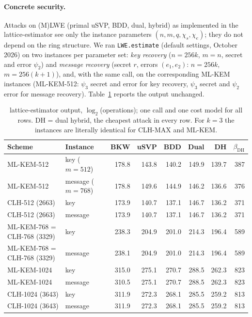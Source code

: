 \documentclass[11pt]{article}
\theoremstyle{remark}
\begin{document}
\paragraph{Concrete security.} Attacks on (M)LWE (primal uSVP, BDD, dual, hybrid) as implemented in the lattice-estimator \cite{APS15} see only the instance parameters $(n,m,q,\chi_s,\chi_e)$; they do not depend on the ring structure. We ran \texttt{LWE.estimate} (default settings, October 2026) on two instances per parameter set: \emph{key recovery} ($n=256k$, $m=n$, secret and error $\psi_2$) and \emph{message recovery} (secret $r$, errors $(e_1,e_2)$: $n=256k$, $m=256(k+1)$), and, with the same call, on the corresponding ML-KEM instances (ML-KEM-512: $\psi_3$ secret and error for key recovery, $\psi_3$ secret and $\psi_2$ error for message recovery). Table~\ref{tab:est} reports the output unchanged.
\begin{table}[h]\centering\small\setlength{\tabcolsep}{4pt}
\begin{tabular}{llrrrrrr}\toprule
Scheme & Instance & BKW & uSVP & BDD & Dual & DH & $\beta_{\mathrm{DH}}$\\\midrule
ML-KEM-512 & key ($m{=}512$) & 178.8 & 143.8 & 140.2 & 149.9 & 139.7 & 387\\
ML-KEM-512 & message ($m{=}768$) & 178.8 & 149.6 & 144.9 & 146.2 & 136.6 & 376\\
CLH-512 (2663) & key & 173.9 & 140.7 & 137.1 & 146.7 & 136.2 & 371\\
CLH-512 (2663) & message & 173.9 & 140.7 & 137.1 & 146.7 & 136.2 & 371\\\midrule
ML-KEM-768 = CLH-768 (3329) & key & 238.3 & 204.9 & 201.0 & 214.3 & 196.4 & 589\\
ML-KEM-768 = CLH-768 (3329) & message & 238.1 & 204.9 & 201.0 & 214.3 & 196.4 & 589\\\midrule
ML-KEM-1024 & key & 315.0 & 275.1 & 270.7 & 288.5 & 262.3 & 823\\
ML-KEM-1024 & message & 310.5 & 275.1 & 270.7 & 288.5 & 262.3 & 823\\
CLH-1024 (3643) & key & 311.9 & 272.3 & 268.1 & 285.5 & 259.2 & 813\\
CLH-1024 (3643) & message & 311.9 & 272.3 & 268.1 & 285.5 & 259.2 & 813\\\bottomrule
\end{tabular}
\caption{lattice-estimator output, $\log_2$(operations); one call and one cost model for all rows. DH = dual hybrid, the cheapest attack in every row. For $k=3$ the instances are literally identical for CLH-MAX and ML-KEM.}\label{tab:est}
\end{table}
\end{document}
